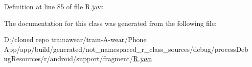 Definition at line 85 of file R.\+java.



The documentation for this class was generated from the following file\+:\begin{DoxyCompactItemize}
\item 
D\+:/cloned repo trainawear/train-\/\+A-\/wear/\+Phone App/app/build/generated/not\+\_\+namespaced\+\_\+r\+\_\+class\+\_\+sources/debug/process\+Debug\+Resources/r/android/support/fragment/\mbox{\hyperlink{process_debug_resources_2r_2android_2support_2fragment_2_r_8java}{R.\+java}}\end{DoxyCompactItemize}

